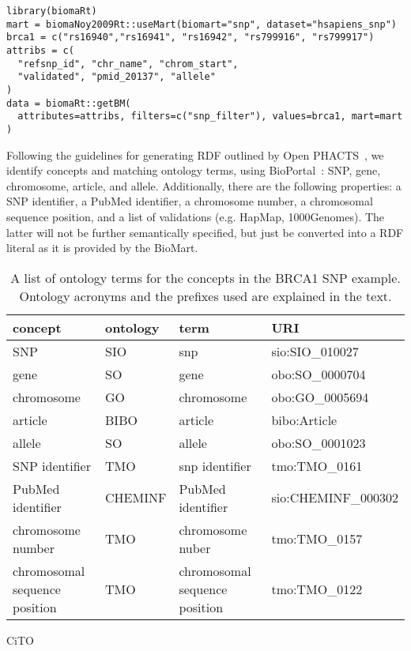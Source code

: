 \documentclass[12pt]{article}
\begin{document}
\begin{verbatim}
library(biomaRt)
mart = biomaNoy2009Rt::useMart(biomart="snp", dataset="hsapiens_snp")
brca1 = c("rs16940","rs16941", "rs16942", "rs799916", "rs799917")
attribs = c(
  "refsnp_id", "chr_name", "chrom_start",
  "validated", "pmid_20137", "allele"
)
data = biomaRt::getBM(
  attributes=attribs, filters=c("snp_filter"), values=brca1, mart=mart
)
\end{verbatim}

Following the guidelines for generating RDF outlined by Open PHACTS~\cite{Haupt2013,Williams2012}, we identify concepts
and matching ontology terms, using BioPortal~\cite{Noy2009}: SNP, gene, chromosome,
article, and allele. Additionally, there are the following properties: a SNP identifier, a PubMed identifier,
a chromosome number, a chromosomal sequence position, and a list of validations (e.g. HapMap, 1000Genomes).
The latter will not be further semantically specified, but just be converted into a RDF literal as it is
provided by the BioMart.

\begin{table}
\caption{A list of ontology terms for the concepts in the BRCA1 SNP example. Ontology acronyms and the prefixes
used are explained in the text.}
\begin{center}
\begin{tabular}{l|l|l|l}
 \textbf{concept} & \textbf{ontology} & \textbf{term} & \textbf{URI} \\
\hline
 SNP & SIO & snp & sio:SIO\_010027 \\
 gene & SO & gene & obo:SO\_0000704 \\
 chromosome & GO & chromosome & obo:GO\_0005694 \\
 article &  BIBO & article & bibo:Article \\
 allele & SO & allele & obo:SO\_0001023 \\
 SNP identifier & TMO & snp identifier & tmo:TMO\_0161 \\
 PubMed identifier & CHEMINF & PubMed identifier & sio:CHEMINF\_000302\\
 chromosome number & TMO & chromosome nuber & tmo:TMO\_0157 \\
 chromosomal sequence position & TMO & chromosomal sequence position & tmo:TMO\_0122 \\
\end{tabular}CiTO
\end{center}
\end{table}
\end{document}
